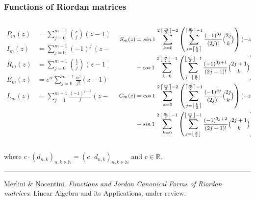 \documentclass[9pt]{beamer}
\begin{document}
\begin{frame}[fragile]
\frametitle{Functions of Riordan matrices}
\begin{columns}
    \begin{column}{0.35\textwidth}
        \begin{displaymath}
        \begin{split}
          P_{m}(z) &= \sum_{j=0}^{m-1}{\binom{r}{j}}{(z-1)^{j} }\\
          I_{m}(z) &= \sum_{j=0}^{m-1}{(-1)^{j}\,\left(z-1\right)^{j}}\\
          R_{m}(z) &= \sum_{j=0}^{m-1}{{\frac{1}{2} \choose j}\left(z-1\right)^{j}}\\
          E_{m}(z) &= e^{\alpha} \sum_{j=0}^{m-1}{\frac{\alpha^{j}}{j!}\left(z-1\right)^{j}}\\
          L_{m}(z) &= \sum_{j=1}^{m-1}{\frac{(-1)^{j-1}}{j}{\left(z-1\right)^{j} }}\\
        \end{split}
        \end{displaymath}
    \end{column}
    \vrule{}
    \begin{column}{0.65\textwidth}
        \begin{displaymath}
        \footnotesize
        \begin{split}
          S_{m}(z)  &= sin\,{1}\,\sum_{k=0}^{2\,\left\lceil \frac{m}{2} \right\rceil-2}{\left(\sum_{j=\left\lceil \frac{k}{2}\right\rceil}^{\left\lceil \frac{m}{2} \right\rceil -1}{\frac{(-1)^{3j}}{(2j)!}{2j\choose k}}\right) {(-z)^{k}}}\\
                    &+ cos\,{1}\,\sum_{k=0}^{2\,\left\lfloor \frac{m}{2} \right\rfloor-1}{\left(\sum_{j=\left\lfloor \frac{k}{2}\right\rfloor}^{\left\lfloor \frac{m}{2} \right\rfloor -1}{\frac{(-1)^{3j+1}}{(2j + 1)!} {2j+1\choose k}}\right){(-z)^{k}}}\\
          C_{m}(z)  &= cos\,{1}\,\sum_{k=0}^{2\,\left\lceil \frac{m}{2} \right\rceil-2}{\left(\sum_{j=\left\lceil \frac{k}{2}\right\rceil}^{\left\lceil \frac{m}{2} \right\rceil -1}{\frac{(-1)^{3j}}{(2j)!}{2j\choose k}}\right) {(-z)^{k}}}\\
                    &+ sin\,{1}\,\sum_{k=0}^{2\,\left\lfloor \frac{m}{2} \right\rfloor-1}{\left(\sum_{j=\left\lfloor \frac{k}{2}\right\rfloor}^{\left\lfloor \frac{m}{2} \right\rfloor -1}{\frac{(-1)^{3j+2}}{(2j + 1)!} {2j+1\choose k}}\right){(-z)^{k}}}\\
        \end{split}
        \end{displaymath}
    \end{column}
\end{columns}
where $c\cdot(d_{n,k})_{n,k\in\mathbb{N}} = (c\cdot d_{n,k})_{n,k\in\mathbb{N}}$
and $c\in\mathbb{R}$.
\vfill
\noindent\rule{\textwidth}{0.1pt}
{\footnotesize
Merlini \& Nocentini. \textit{Functions and Jordan Canonical Forms of Riordan
matrices}. \newline Linear Algebra and its Applications, under review.}
\end{frame}
\end{document}
